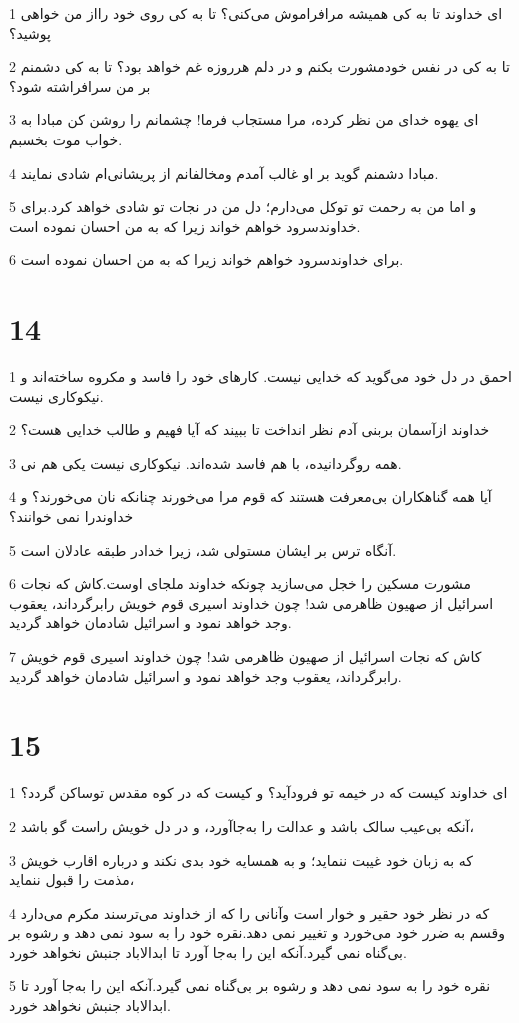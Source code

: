 \par 1 ای خداوند تا به کی همیشه مرافراموش می‌کنی؟ تا به کی روی خود رااز من خواهی پوشید؟
\par 2 تا به کی در نفس خودمشورت بکنم و در دلم هرروزه غم خواهد بود؟ تا به کی دشمنم بر من سرافراشته شود؟
\par 3 ‌ای یهوه خدای من نظر کرده، مرا مستجاب فرما! چشمانم را روشن کن مبادا به خواب موت بخسبم.
\par 4 مبادا دشمنم گوید بر او غالب آمدم ومخالفانم از پریشانی‌ام شادی نمایند.
\par 5 و اما من به رحمت تو توکل می‌دارم؛ دل من در نجات تو شادی خواهد کرد.برای خداوندسرود خواهم خواند زیرا که به من احسان نموده است.
\par 6 برای خداوندسرود خواهم خواند زیرا که به من احسان نموده است.
 
\chapter{14}

\par 1 احمق در دل خود می‌گوید که خدایی نیست. کارهای خود را فاسد و مکروه ساخته‌اند و نیکوکاری نیست.
\par 2 خداوند ازآسمان بربنی آدم نظر انداخت تا ببیند که آیا فهیم و طالب خدایی هست؟
\par 3 همه روگردانیده، با هم فاسد شده‌اند. نیکوکاری نیست یکی هم نی.
\par 4 آیا همه گناهکاران بی‌معرفت هستند که قوم مرا می‌خورند چنانکه نان می‌خورند؟ و خداوندرا نمی خوانند؟
\par 5 آنگاه ترس بر ایشان مستولی شد، زیرا خدادر طبقه عادلان است.
\par 6 مشورت مسکین را خجل می‌سازید چونکه خداوند ملجای اوست.کاش که نجات اسرائیل از صهیون ظاهرمی شد! چون خداوند اسیری قوم خویش رابرگرداند، یعقوب وجد خواهد نمود و اسرائیل شادمان خواهد گردید.
\par 7 کاش که نجات اسرائیل از صهیون ظاهرمی شد! چون خداوند اسیری قوم خویش رابرگرداند، یعقوب وجد خواهد نمود و اسرائیل شادمان خواهد گردید.
 
\chapter{15}

\par 1 ای خداوند کیست که در خیمه تو فرودآید؟ و کیست که در کوه مقدس توساکن گردد؟
\par 2 آنکه بی‌عیب سالک باشد و عدالت را به‌جاآورد، و در دل خویش راست گو باشد،
\par 3 که به زبان خود غیبت ننماید؛ و به همسایه خود بدی نکند و درباره اقارب خویش مذمت را قبول ننماید،
\par 4 که در نظر خود حقیر و خوار است وآنانی را که از خداوند می‌ترسند مکرم می‌دارد وقسم به ضرر خود می‌خورد و تغییر نمی دهد.نقره خود را به سود نمی دهد و رشوه بر بی‌گناه نمی گیرد.آنکه این را به‌جا آورد تا ابدالاباد جنبش نخواهد خورد.
\par 5 نقره خود را به سود نمی دهد و رشوه بر بی‌گناه نمی گیرد.آنکه این را به‌جا آورد تا ابدالاباد جنبش نخواهد خورد.
 
